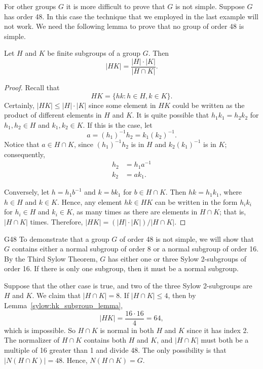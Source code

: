  

 
 
For other groups $G$ it is more difficult to prove that $G$ is not
simple. Suppose $G$ has order 48. In this case the technique that we
employed in the last example will not work.  We need the following
lemma to prove that no group of order 48 is simple.  
 
 
\begin{lemma}\label{sylow:hk_subgroup_lemma}
Let $H$ and $K$ be finite subgroups of a group $G$. Then
\[
|HK| = \frac{|H| \cdot |K|}{|H \cap K|}.
\]
\end{lemma}
 
 
\begin{proof}
Recall that
\[
HK = \{ hk : h \in H, k \in K \}.
\]
Certainly, $|HK| \leq |H| \cdot |K|$ since some element in $HK$
could be written as the product of different elements in $H$ and $K$.
It is quite possible that $h_1 k_1 = h_2 k_2$ for $h_1, h_2 \in H$ and
$k_1, k_2 \in K$.  If this is the case, let
\[
a = (h_1)^{-1} h_2 = k_1 (k_2)^{-1}.
\]
Notice that $a \in H \cap K$, since $(h_1)^{-1} h_2$ is in $H$ and
$k_2 (k_1)^{-1}$ is in $K$; consequently, 
\begin{align*}
h_2 & =  h_1 a^{-1} \\
k_2 & =  a k_1.
\end{align*}
 
 
Conversely, let $h = h_1 b^{-1}$ and $k = b k_1$ for $b \in  H
\cap K$. Then $h k = h_1 k_1$, where $h \in H$ and $k \in K$. Hence,
any element $hk \in HK$ can be written in the form $h_i k_i$ for $h_i
\in H$ and $k_i \in K$, as many times as there are elements in $H
\cap K$; that is, $|H \cap K|$ times. Therefore, $|HK| = (|H| \cdot
|K|)/|H \cap K|$. 
\mbox{\hspace*{1in}}
\end{proof}
 
 
 
\begin{example}{G48}
To demonstrate that a group $G$ of order 48 is not simple, we will
show that $G$ contains either a normal subgroup of order 8 or a normal
subgroup of order 16.  By the Third Sylow Theorem, $G$ has either one
or three Sylow 2-subgroups of order 16.  If there is only one
subgroup, then it must be a normal subgroup. 


 
 
Suppose that the other case is true, and two of the three Sylow
2-subgroups are $H$ and $K$. We claim that  $|H \cap K| = 8$.  If $|H
\cap K| \leq 4$, then by Lemma~\ref{sylow:hk_subgroup_lemma}, 
\[
|HK| = \frac{16 \cdot 16}{4} =64,
\]
which is impossible.  So $H \cap K$ is normal in both $H$ and $K$
since it has index 2. The normalizer of $H \cap K$ contains both $H$
and $K$, and $|H \cap K|$ must both be a multiple of 16 greater than
1 and divide 48. The only possibility is that $|N(H \cap K)|= 48$.
Hence, $N(H \cap K) = G$.
\end{example}
 
